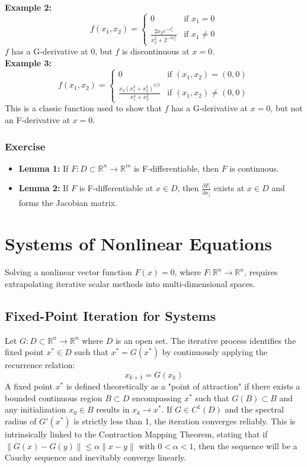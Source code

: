 \documentclass[12pt, a4paper]{article}
\theoremstyle{break}
\begin{document}
\textbf{Example 2:}
\begin{equation*}
    f(x_1, x_2) = 
    \begin{cases} 
    0 & \text{if } x_1 = 0 \\ 
    \frac{2x_2 e^{-x_1^2}}{x_2^2 + 2^{-2x_1^2}} & \text{if } x_1 \neq 0 
    \end{cases}
\end{equation*}
$f$ has a G-derivative at $0$, but $f$ is discontinuous at $x = 0$. \\
\textbf{Example 3:}
\begin{equation*}
    f(x_1, x_2) = 
    \begin{cases} 
    0 & \text{if } (x_1, x_2) = (0,0) \\ 
    \frac{x_2 (x_1^2 + x_2^2)^{3/2}}{x_1^4 + x_2^2} & \text{if } (x_1, x_2) \neq (0,0) 
    \end{cases}
\end{equation*}
This is a classic function used to show that $f$ has a G-derivative at $x=0$, but not an F-derivative at $x=0$.
\subsubsection*{Exercise}
\begin{itemize}
    \item \textbf{Lemma 1:} If $F: D \subset \mathbb{R}^n \to \mathbb{R}^m$ is F-differentiable, then $F$ is continuous.
    \item \textbf{Lemma 2:} If $F$ is F-differentiable at $x \in D$, then $\frac{\partial F_i}{\partial x_j}$ exists at $x \in D$ and forms the Jacobian matrix.
\end{itemize}

\section{Systems of Nonlinear Equations}
Solving a nonlinear vector function $F(x) = 0$, where $F: \mathbb{R}^n \to \mathbb{R}^n$, requires extrapolating iterative scalar methods into multi-dimensional spaces.

\subsection{Fixed-Point Iteration for Systems}
Let $G: D \subset \mathbb{R}^n \to \mathbb{R}^n$ where $D$ is an open set. The iterative process identifies the fixed point $x^* \in D$ such that $x^* = G(x^*)$ by continuously applying the recurrence relation:
$$x_{k+1} = G(x_k)$$
A fixed point $x^*$ is defined theoretically as a "point of attraction" if there exists a bounded continuous region $B \subset D$ encompassing $x^*$ such that $G(B) \subset B$ and any initialization $x_0 \in B$ results in $x_k \to x^*$. 
If $G \in C^1(D)$ and the spectral radius of $G'(x^*)$ is strictly less than 1, the iteration converges reliably. This is intrinsically linked to the Contraction Mapping Theorem, stating that if $\|G(x) - G(y)\| \le \alpha \|x - y\|$ with $0 < \alpha < 1$, then the sequence will be a Cauchy sequence and inevitably converge linearly.
\end{document}
